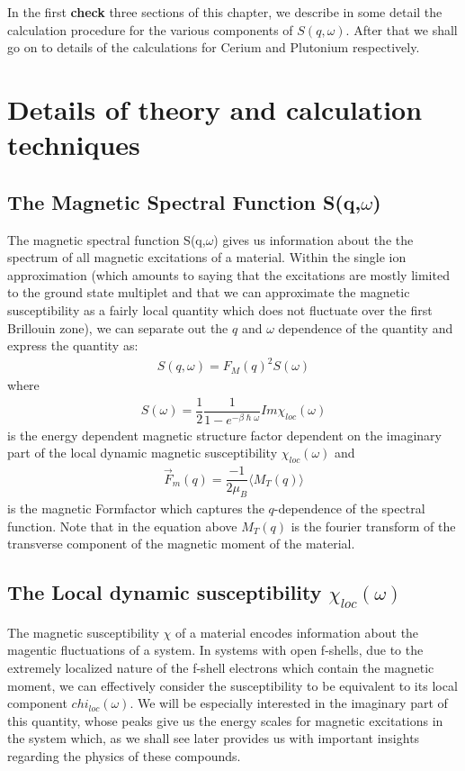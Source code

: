 \documentclass[10pt]{ruthesis}
\begin{document}
{In the first \textbf{check} three sections of this chapter, we describe in some detail the calculation procedure for the various components of $S(q,\omega)$. After that we shall go on to details of the calculations for Cerium and Plutonium respectively.
\section{Details of theory and calculation techniques}
\subsection{The Magnetic Spectral Function S(q,$\omega$)}
The magnetic spectral function S(q,$\omega$) gives us information about the the spectrum of all magnetic excitations of a material. Within the single ion approximation (which amounts to saying that the excitations are mostly limited to the ground state multiplet and that we can approximate the magnetic susceptibility as a fairly local quantity which does not fluctuate over the first Brillouin zone), we can separate out the $q$ and $\omega$ dependence of the quantity and express the quantity as:
\begin{align}
S(q,\omega)=F_{M}(q)^{2} S(\omega)
\end{align}
where
\begin{align}
S(\omega)=\dfrac{1}{2}\dfrac{1}{1-e^{-\beta\hslash\omega}}Im \chi_{loc}(\omega)
\end{align}
is the energy dependent magnetic structure factor dependent on the imaginary part of the local dynamic magnetic susceptibility $\chi_{loc}(\omega)$ and
\begin{align}
\vec{F}_{m}(q)=\dfrac{-1}{2\mu_{B}}\langle M_{T}(q) \rangle
\end{align}
is the magnetic Formfactor which captures the $q$-dependence of the spectral function. Note that in the equation above $M_{T}(q)$ is the  fourier transform of the transverse component of the magnetic moment of the material.

\subsection{The Local dynamic susceptibility $\chi_{loc}(\omega)$ }
The magnetic susceptibility $\chi$ of a material encodes information about the magentic fluctuations of a system. In systems with open f-shells, due to the extremely localized nature of the f-shell electrons which contain the magnetic moment, we can effectively consider the susceptibility to be equivalent to its local component $chi_{loc}(\omega)$. We will be especially interested in the imaginary part of this quantity, whose peaks give us the energy scales for magnetic excitations in the system which, as we shall see later provides us with important insights regarding the physics of these compounds.

}
\end{document}
